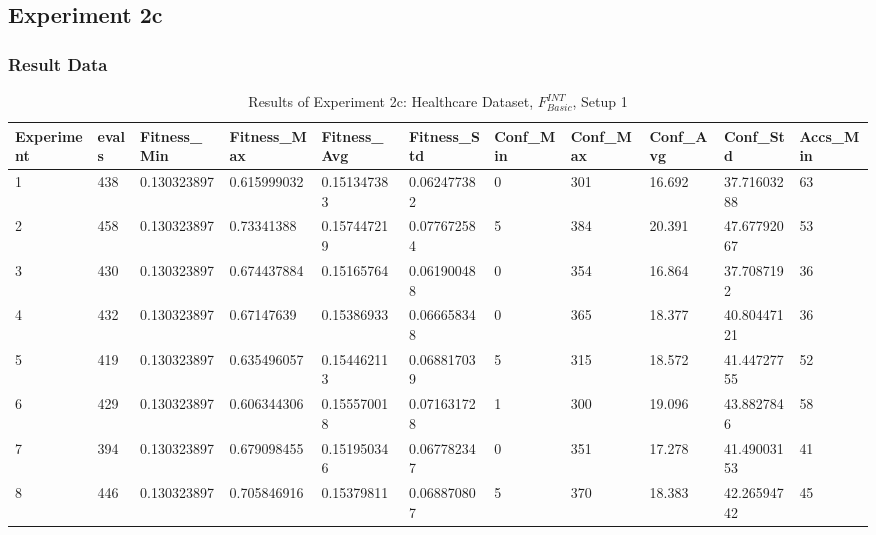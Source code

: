 	\subsection{Experiment 2c}
	\label{sec:A_Exp2c}
		\subsubsection{Result Data}
		\label{sec:A_Exp2c_Data}
			\begin{table}[H]
				\caption{Results of Experiment 2c: Healthcare Dataset, $F_{Basic}^{INT}$, Setup 1}
				\label{tab:A_Exp2c_Data}
				\begin{adjustbox}{max width=380pt,keepaspectratio,angle=90}
					\begin{tabular}{|l|l|l|l|l|l|l|l|l|l|l|}
						\rowcolor[HTML]{EFEFEF} 
						\hline
						Experiment & evals & Fitness\_Min & Fitness\_Max & Fitness\_Avg & Fitness\_Std & Conf\_Min & Conf\_Max & Conf\_Avg & Conf\_Std   & Accs\_Min \\ \hline
						1          & 438   & 0.130323897  & 0.615999032  & 0.151347383  & 0.062477382  & 0         & 301       & 16.692    & 37.71603288 & 63        \\ \hline
						2          & 458   & 0.130323897  & 0.73341388   & 0.157447219  & 0.077672584  & 5         & 384       & 20.391    & 47.67792067 & 53        \\ \hline
						3          & 430   & 0.130323897  & 0.674437884  & 0.15165764   & 0.061900488  & 0         & 354       & 16.864    & 37.7087192  & 36        \\ \hline
						4          & 432   & 0.130323897  & 0.67147639   & 0.15386933   & 0.066658348  & 0         & 365       & 18.377    & 40.80447121 & 36        \\ \hline
						5          & 419   & 0.130323897  & 0.635496057  & 0.154462113  & 0.068817039  & 5         & 315       & 18.572    & 41.44727755 & 52        \\ \hline
						6          & 429   & 0.130323897  & 0.606344306  & 0.155570018  & 0.071631728  & 1         & 300       & 19.096    & 43.8827846  & 58        \\ \hline
						7          & 394   & 0.130323897  & 0.679098455  & 0.151950346  & 0.067782347  & 0         & 351       & 17.278    & 41.49003153 & 41        \\ \hline
						8          & 446   & 0.130323897  & 0.705846916  & 0.15379811   & 0.068870807  & 5         & 370       & 18.383    & 42.26594742 & 45        \\ \hline

\end{tabular}
\end{adjustbox}
\end{table}
